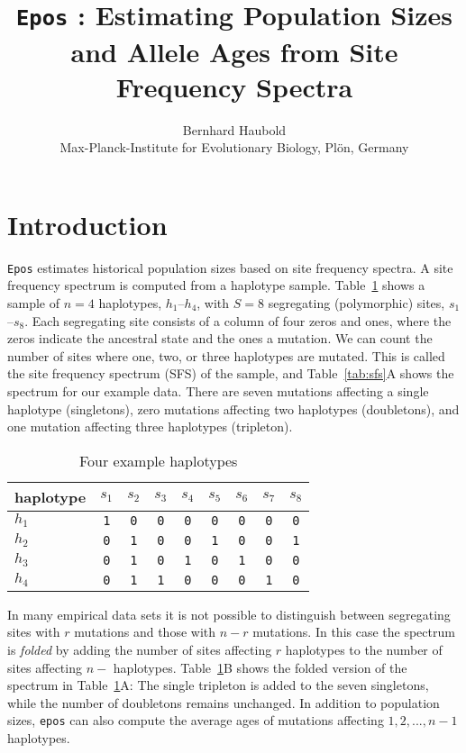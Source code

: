 \documentclass[a4paper]{article}
\newcommand{\ty}{\texttt}
\begin{document}
\title{\ty{Epos} : Estimating Population Sizes and Allele Ages from
  Site Frequency Spectra}
\author{Bernhard Haubold\\\small Max-Planck-Institute for Evolutionary Biology, Pl\"on, Germany}
\maketitle
\section{Introduction} 
\ty{Epos} estimates historical population sizes based on site
frequency spectra. A site frequency spectrum is computed from a
haplotype sample. Table~\ref{tab:hap} shows a sample of $n=4$ haplotypes,
$h_1$--$h_4$, with $S=8$ segregating (polymorphic)
sites, $s_1$--$s_8$. Each segregating site consists of a column of four zeros and ones, where the
zeros indicate the ancestral state and the ones a mutation. We can
count the number of sites where one, two, or three haplotypes are mutated. This is called
the site frequency spectrum (SFS) of the sample, and Table~\ref{tab:sfs}A shows the spectrum
for our example data. There are seven mutations affecting a
single haplotype (singletons), zero mutations affecting two haplotypes
(doubletons), and one mutation affecting three haplotypes (tripleton).
\begin{table}
  \caption{Four example haplotypes}\label{tab:hap}
  \begin{center}
    \begin{tabular}{lcccccccc}\hline
haplotype   &   $s_1$ & $s_2$ & $s_3$ & $s_4$ & $s_5$ & $s_6$ & $s_7$ & $s_8$\\\hline
$h_1$ &      \ty{1} & \ty{0} & \ty{0} & \ty{0} & \ty{0} & \ty{0} & \ty{0} & \ty{0}\\
$h_2$ &      \ty{0} & \ty{1} & \ty{0} & \ty{0} & \ty{1} & \ty{0} & \ty{0} & \ty{1}\\
$h_3$ &      \ty{0} & \ty{1} & \ty{0} & \ty{1} & \ty{0} & \ty{1} & \ty{0} & \ty{0}\\
$h_4$ &      \ty{0} & \ty{1} & \ty{1} & \ty{0} & \ty{0} & \ty{0} & \ty{1} &
      \ty{0}\\\hline
      \end{tabular}
  \end{center}
\end{table}
In many empirical data sets it is not possible to distinguish between
segregating sites with $r$ mutations and those with $n-r$
mutations. In this case the spectrum is \textit{folded} by adding the
number of sites affecting $r$ haplotypes to the number of sites
affecting $n-$ haplotypes. Table~\ref{tab:hap}B shows the folded
version of the spectrum in Table~\ref{tab:hap}A: The single tripleton
is added to the seven singletons, while the number of doubletons
remains unchanged.
In addition to population sizes, \ty{epos} can also compute the
average ages of mutations affecting $1, 2,...,n-1$ haplotypes.
\end{document}

